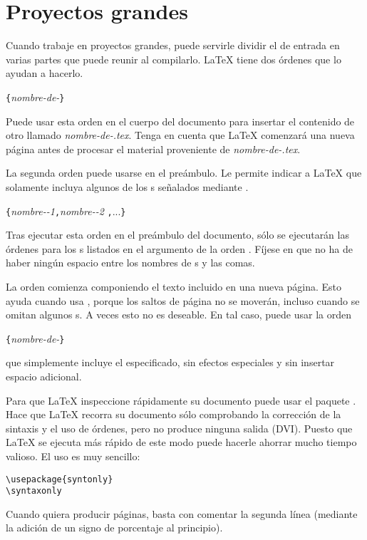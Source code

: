 

\section{Proyectos grandes}

Cuando trabaje en proyectos grandes, puede servirle dividir el \filenomo{} de entrada en varias partes que puede reunir al compilarlo.  \LaTeX{} tiene dos órdenes que lo ayudan a hacerlo.

\begin{lscommand}
\verb|{|\emph{nombre-de-\filenomo{}}\verb|}|
\end{lscommand}
%
Puede usar esta orden en el cuerpo del documento para insertar el contenido de otro \filenomo{} llamado \emph{nombre-de-\filenomo{}.tex}.  Tenga en cuenta que \LaTeX{} comenzará una nueva página antes de procesar el material proveniente de \emph{nombre-de-\filenomo{}.tex}.

La segunda orden puede usarse en el preámbulo.  Le permite indicar a \LaTeX{} que solamente incluya algunos de los \filenomo{}s señalados mediante \verb||.
\begin{lscommand}
\verb|{|\emph{nombre-\filenomo{}-1}\verb|,|\emph{nombre-\filenomo{}-2}%
\verb|,|...\verb|}|
\end{lscommand}
Tras ejecutar esta orden en el preámbulo del documento, sólo se ejecutarán las órdenes  para los \filenomo{}s listados en el argumento de la orden .  Fíjese en que no ha de haber ningún espacio entre los nombres de \filenomo{}s y las comas.

La orden  comienza componiendo el texto incluido en una nueva página.  Esto ayuda cuando usa , porque los saltos de página no se moverán, incluso cuando se omitan algunos \filenomo{}s.  A veces esto no es deseable.  En tal caso, puede usar la orden
\begin{lscommand}
\verb|{|\emph{nombre-de-\filenomo{}}\verb|}|
\end{lscommand}
que simplemente incluye el \filenomo{} especificado, sin efectos especiales y sin insertar espacio adicional.

Para que \LaTeX{} inspeccione rápidamente su documento puede usar el paquete .  Hace que \LaTeX{} recorra su documento sólo comprobando la corrección de la sintaxis y el uso de órdenes, pero no produce ninguna salida (DVI).  Puesto que \LaTeX{} se ejecuta más rápido de este modo puede hacerle ahorrar mucho tiempo valioso.  El uso es muy sencillo:

\begin{verbatim}
\usepackage{syntonly}
\syntaxonly
\end{verbatim}
Cuando quiera producir páginas, basta con comentar la segunda línea (mediante la adición de un signo de porcentaje al principio).

%